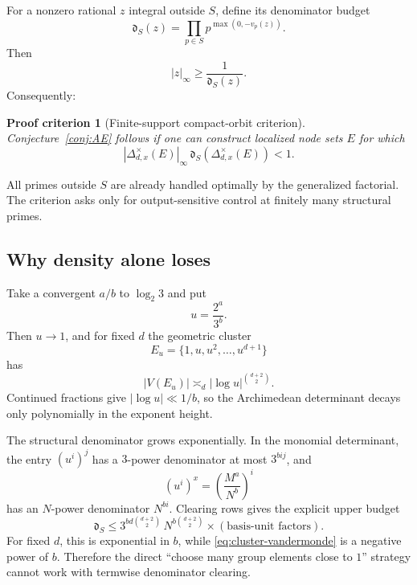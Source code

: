 \documentclass[11pt,oneside]{article}
\newtheorem{criterion}[theorem]{Proof criterion}
\theoremstyle{definition}
\theoremstyle{remark}
\begin{document}
For a nonzero rational \(z\) integral outside \(S\), define its denominator budget
\[
 \mathfrak d_S(z)=\prod_{p\in S}p^{\max(0,-v_p(z))}.
\]
Then
\begin{equation}
 |z|_\infty\ge\frac1{\mathfrak d_S(z)}.
 \label{eq:S-lower}
\end{equation}
Consequently:

\begin{criterion}[Finite-support compact-orbit criterion]
\label{crit:finite-support}
Conjecture~\ref{conj:AE} follows if one can construct localized node sets \(E\) for which
\begin{equation}
 |\Delta^\times_{d,x}(E)|_\infty\,
 \mathfrak d_S(\Delta^\times_{d,x}(E))<1.
 \label{eq:finite-support-criterion}
\end{equation}
\end{criterion}

All primes outside \(S\) are already handled optimally by the generalized factorial.  The
criterion asks only for output-sensitive control at finitely many structural primes.

\subsection{Why density alone loses}

Take a convergent \(a/b\) to \(\log_2 3\) and put
\[
 u=\frac{2^a}{3^b}.
\]
Then \(u\to1\), and for fixed \(d\) the geometric cluster
\[
 E_u=\{1,u,u^2,\ldots,u^{d+1}\}
\]
has
\begin{equation}
 |V(E_u)|\asymp_d|\log u|^{\binom{d+2}{2}}.
 \label{eq:cluster-vandermonde}
\end{equation}
Continued fractions give \(|\log u|\ll1/b\), so the Archimedean determinant decays only
polynomially in the exponent height.

The structural denominator grows exponentially.  In the monomial determinant, the entry
\((u^i)^j\) has a \(3\)-power denominator at most \(3^{bij}\), and
\[
 (u^i)^x=\left(\frac{M^a}{N^b}\right)^i
\]
has an \(N\)-power denominator \(N^{bi}\).  Clearing rows gives the explicit upper budget
\begin{equation}
 \mathfrak d_S
 \le
 3^{bd\binom{d+2}{2}}\,
 N^{b\binom{d+2}{2}}
 \times(\text{basis-unit factors}).
 \label{eq:row-clear-budget}
\end{equation}
For fixed \(d\), this is exponential in \(b\), while
\eqref{eq:cluster-vandermonde} is a negative power of \(b\).  Therefore the direct
``choose many group elements close to \(1\)'' strategy cannot work with termwise denominator
clearing.
\end{document}
